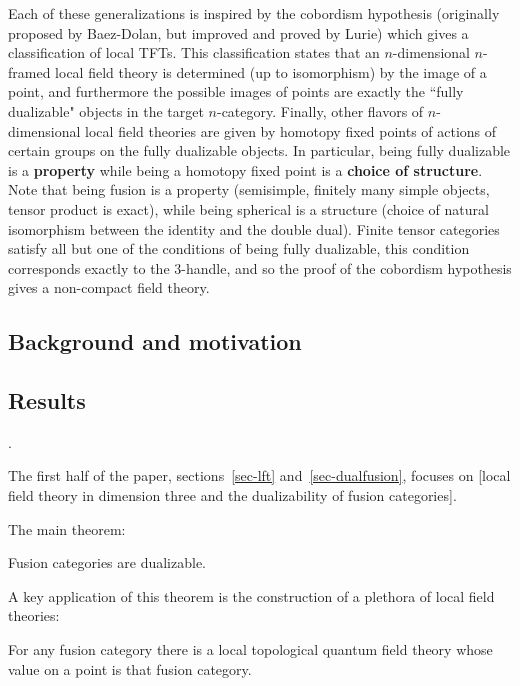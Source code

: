 \documentclass{amsart}
\begin{document}
Each of these generalizations is inspired by the cobordism hypothesis (originally proposed by Baez-Dolan, but improved and proved by Lurie) which gives a classification of local TFTs.  This classification states that an $n$-dimensional $n$-framed local field theory is determined (up to isomorphism) by the image of a point, and furthermore the possible images of points are exactly the ``fully dualizable" objects in the target $n$-category.  Finally, other flavors of $n$-dimensional local field theories are given by homotopy fixed points of actions of certain groups on the fully dualizable objects.  In particular, being fully dualizable is a {\bf property} while being a homotopy fixed point is a {\bf choice of structure}.  Note that being fusion is a property (semisimple, finitely many simple objects, tensor product is exact), while being spherical is a structure (choice of natural isomorphism between the identity and the double dual).  Finite tensor categories satisfy all but one of the conditions of being fully dualizable, this condition corresponds exactly to the $3$-handle, and so the proof of the cobordism hypothesis gives a non-compact field theory.


\subsection{Background and motivation}

\subsection{Results}.


The first half of the paper, sections~\ref{sec-lft} and~\ref{sec-dualfusion}, focuses on [local field theory in dimension three and the dualizability of fusion categories].

The main theorem:
\begin{theorem}
Fusion categories are dualizable.
\end{theorem}

A key application of this theorem is the construction of a plethora of local field theories:
\begin{corollary}
For any fusion category there is a local topological quantum field theory whose value on a point is that fusion category.
\end{corollary}
\end{document}
